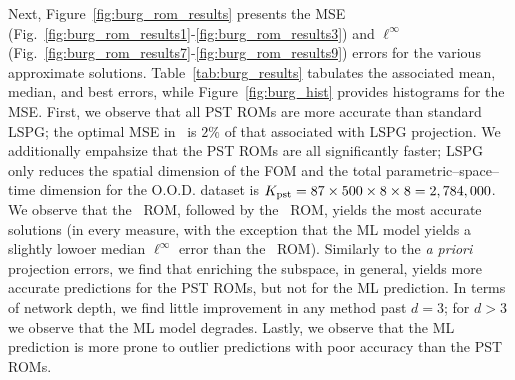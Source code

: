 \documentclass[3p,computermodern,10pt]{elsarticle}
\begin{document}
Next, Figure~\ref{fig:burg_rom_results} presents the MSE (Fig.~\ref{fig:burg_rom_results1}-\ref{fig:burg_rom_results3}) and %
$\ell^{\infty}$ (Fig.~\ref{fig:burg_rom_results7}-\ref{fig:burg_rom_results9}) errors for the various approximate solutions. Table~\ref{tab:burg_results} tabulates the associated mean, median, and best errors, while Figure~\ref{fig:burg_hist} provides histograms for the MSE. First, we observe that all PST ROMs are more accurate than standard LSPG; the optimal MSE in \PSTLSROM\ is $2\%$ of that associated with LSPG projection. We additionally empahsize that the PST ROMs are all significantly faster; LSPG only reduces the spatial dimension of the FOM and the total parametric--space--time dimension for the O.O.D. dataset is $K_{\text{pst}} = 87 \times 500 \times 8 \times 8 = 2,784,000$.  We observe that the \PSTLONEROM\ ROM, followed by the \PSTLSROM\ ROM, yields the most accurate solutions (in every measure, with the exception that the ML model yields a slightly lowoer median $\ell^{\infty}$ error than the \PSTLSROM\ ROM). Similarly to the \textit{a priori}  projection errors, we find that enriching the subspace, in general, yields more accurate predictions for the PST ROMs, but not for the ML prediction. In terms of network depth, we find little improvement in any method past $d=3$; for $d>3$ we observe that the ML model degrades. Lastly, we observe that the ML prediction is more prone to outlier predictions with poor accuracy than the PST ROMs.  

\end{document}
